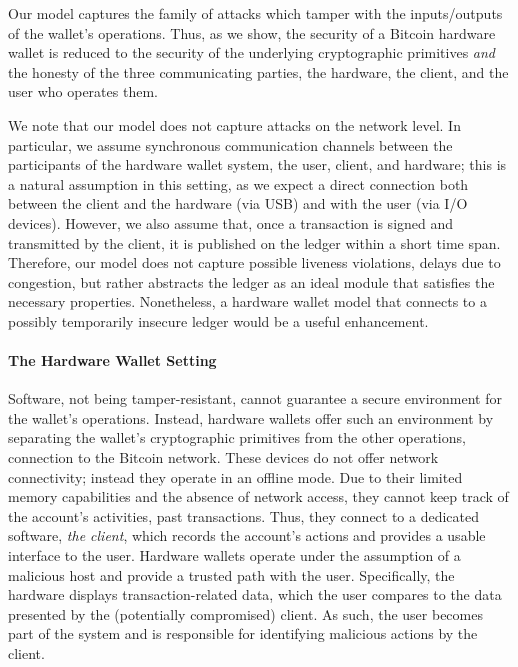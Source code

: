 Our model captures the family of attacks which tamper with the inputs/outputs
of the wallet's operations. Thus, as we show, the security of a Bitcoin
hardware wallet is reduced to the security of the underlying cryptographic
primitives \emph{and} the honesty of the three communicating parties, \ie the
hardware, the client, and the user who operates them.

We note that our model does not capture attacks on the network level. In
particular, we assume synchronous communication channels between the
participants of the hardware wallet system, \ie the user, client, and hardware;
this is a natural assumption in this setting, as we expect a direct connection
both between the client and the hardware (\eg via USB) and with the user (via
I/O devices). However, we also assume that, once a transaction is signed and
transmitted by the client, it is published on the ledger within a short time
span. Therefore, our model does not capture possible liveness violations, \eg
delays due to congestion, but rather abstracts the ledger as an ideal module
that satisfies the necessary properties. Nonetheless, a hardware wallet model
that connects to a possibly temporarily insecure ledger would be a useful
enhancement.

\paragraph{The Hardware Wallet Setting}
Software, not being tamper-resistant, cannot guarantee a secure environment for
the wallet's operations. Instead, hardware wallets offer such an environment by
separating the wallet's cryptographic primitives from the other operations, \eg
connection to the Bitcoin network. These devices do not offer network
connectivity; instead they operate in an offline mode. Due to their limited
memory capabilities and the absence of network access, they cannot keep track
of the account's activities, \eg past transactions. Thus, they connect to a
dedicated software, \emph{the client}, which records the account's actions and
provides a usable interface to the user. Hardware wallets operate under the
assumption of a malicious host and provide a trusted path with the user.
Specifically, the hardware displays transaction-related data, which the user
compares to the data presented by the (potentially compromised) client. As
such, the user becomes part of the system and is responsible for identifying
malicious actions by the client.

